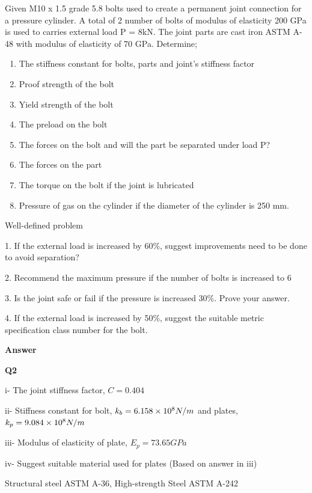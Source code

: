 \documentclass[a4paper, fleqn]{article}
\providecommand{\sci}[1]{\protect\ensuremath{\times 10^{\StrSubstitute[0]{#1}{e}{}}}}
\begin{document}
Given M10 x 1.5 grade 5.8 bolts used to create a permanent joint connection for a pressure cylinder. A total of 2 number of bolts of modulus of elasticity 200 GPa is used to carries external load P = 8kN. The joint parts are cast iron ASTM A-48 with modulus of elasticity of 70 GPa. Determine;

\begin{enumerate}[label=(\roman*)]
    \item The stiffness constant for bolts, parts and joint’s stiffness factor
    \item Proof strength of the bolt
    \item Yield strength of the bolt
    \item The preload on the bolt
    \item The forces on the bolt and will the part be separated under load P?
    \item The forces on the part
    \item The torque on the bolt if the joint is lubricated
    \item Pressure of gas on the cylinder if the diameter of the cylinder is 250 mm.

\end{enumerate}

Well-defined problem

1. If the external load is increased by 60\%, suggest improvements need to be done to avoid separation?

2. Recommend the maximum pressure if the number of bolts is increased to 6

3. Is the joint safe or fail if the pressure is increased 30\%. Prove your answer.

4. If the external load is increased by 50\%, suggest the suitable metric specification class number for the bolt.


\newpage

\textbf{Answer}
\vspace{10pt}

\textbf{Q2}

i- The joint stiffness factor, $C=0.404$

ii- Stiffness constant for bolt, $k_b=6.158\sci{e8}N/m$ and plates, $k_p=9.084\sci{e8}N/m$

iii- Modulus of elasticity of plate, $E_p=73.65GPa$

iv- Suggest suitable material used for plates (Based on answer in iii)

Structural steel ASTM A-36, High-strength Steel ASTM A-242
\end{document}

